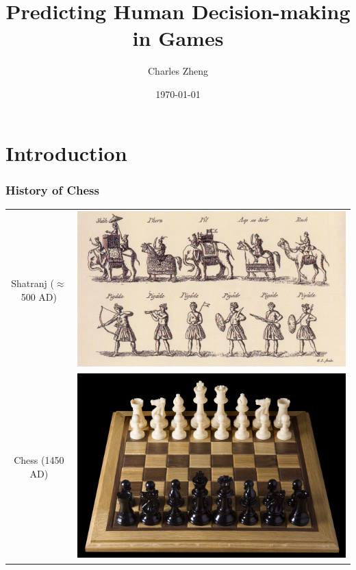 \documentclass{beamer}
\title[Informal]{Predicting Human Decision-making in Games}
\author{Charles Zheng} %
\institute[Stanford] %
{Stanford University}
\date{\today} %
\begin{document}
\begin{frame}
\titlepage %
\end{frame}


\section{Introduction}

\begin{frame}
\frametitle{History of Chess}
\begin{tabular}{cc}
Shatranj ($\approx$500 AD) & \includegraphics[scale = 0.35]{shatranj.jpg}\\
Chess (1450 AD) & \includegraphics[scale = 0.1]{chess.jpg}\\

\end{tabular}
\end{frame}
\end{document}
